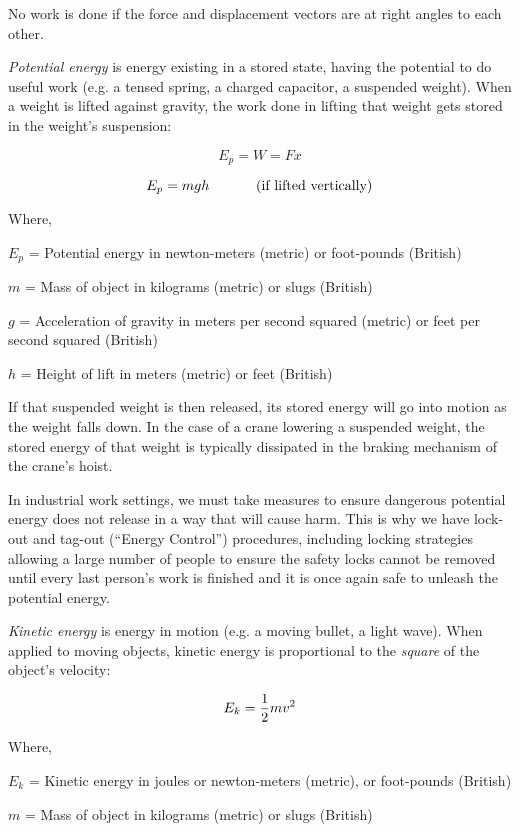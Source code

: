 No work is done if the force and displacement vectors are at right angles to each other.

\vskip 10pt

{\it Potential energy} is energy existing in a stored state, having the potential to do useful work (e.g. a tensed spring, a charged capacitor, a suspended weight).  When a weight is lifted against gravity, the work done in lifting that weight gets stored in the weight's suspension:
 
$$E_p = W = Fx$$

$$E_p = mgh \hbox{ \hskip 30pt (if lifted vertically)}$$

\noindent
Where,

$E_p$ = Potential energy in newton-meters (metric) or foot-pounds (British)

$m$ = Mass of object in kilograms (metric) or slugs (British)

$g$ = Acceleration of gravity in meters per second squared (metric) or feet per second squared (British)

$h$ = Height of lift in meters (metric) or feet (British)

\vskip 10pt

If that suspended weight is then released, its stored energy will go into motion as the weight falls down.  In the case of a crane lowering a suspended weight, the stored energy of that weight is typically dissipated in the braking mechanism of the crane's hoist.

\vskip 10pt

In industrial work settings, we must take measures to ensure dangerous potential energy does not release in a way that will cause harm.  This is why we have lock-out and tag-out (``Energy Control'') procedures, including locking strategies allowing a large number of people to ensure the safety locks cannot be removed until every last person's work is finished and it is once again safe to unleash the potential energy.

\vskip 10pt

{\it Kinetic energy} is energy in motion (e.g. a moving bullet, a light wave).  When applied to moving objects, kinetic energy is proportional to the {\it square} of the object's velocity:

$$E_k = {1 \over 2} mv^2$$

\noindent
Where,

$E_k$ = Kinetic energy in joules or newton-meters (metric), or foot-pounds (British)

$m$ = Mass of object in kilograms (metric) or slugs (British)

